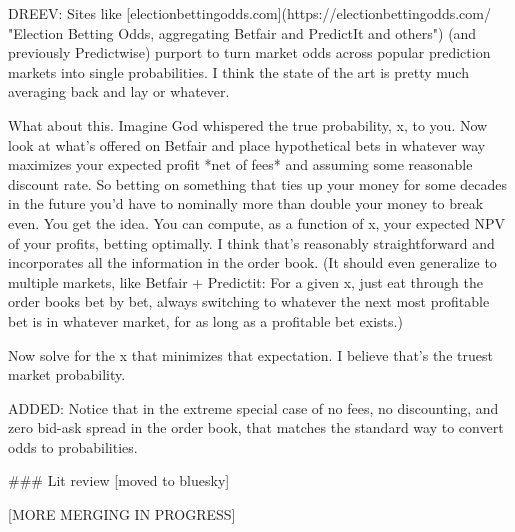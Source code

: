 \documentclass{article}
\begin{document}
\begin{markdown}

DREEV:
Sites like 
[electionbettingodds.com](https://electionbettingodds.com/ "Election Betting Odds, aggregating Betfair and PredictIt and others")
(and previously Predictwise)
purport to turn market odds across popular prediction markets into single probabilities.
I think the state of the art is pretty much averaging back and lay or whatever.

What about this.
Imagine God whispered the true probability, x, to you. 
Now look at what's offered on Betfair and place hypothetical bets in whatever way maximizes your expected profit *net of fees* and assuming some reasonable discount rate. 
So betting on something that ties up your money for some decades in the future you'd have to nominally more than double your money to break even. 
You get the idea. 
You can compute, as a function of x, your expected NPV of your profits, betting optimally. 
I think that's reasonably straightforward and incorporates all the information in the order book. 
(It should even generalize to multiple markets, like Betfair + Predictit: 
For a given x, just eat through the order books bet by bet, always switching to whatever the next most profitable bet is in whatever market, for as long as a profitable bet exists.)

Now solve for the x that minimizes that expectation. 
I believe that's the truest market probability.

ADDED: Notice that in the extreme special case of no fees, no discounting, and zero bid-ask spread in the order book, that matches the standard way to convert odds to probabilities.


### Lit review [moved to bluesky]

[MORE MERGING IN PROGRESS]

\end{markdown}
\end{document}
